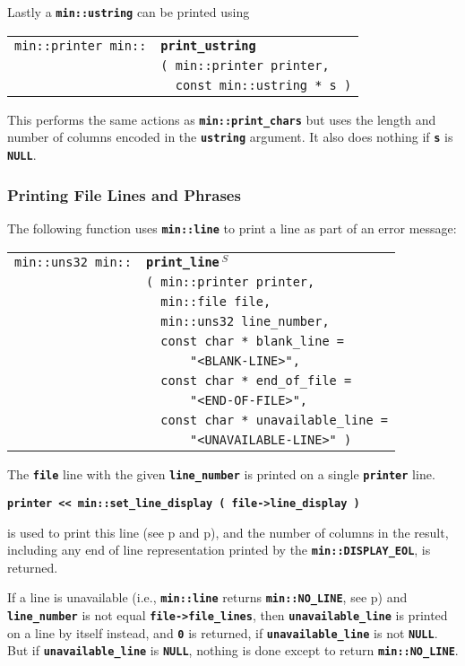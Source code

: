\documentclass[12pt]{article}
\makeatletter
\newcommand{\TT}[1]{{\tt \bfseries #1}}
\newcommand{\ttindex}[1]{\index{#1@{\tt #1}}}
\newcommand{\pagref}[1]{p\pageref{#1}}
\newcommand{\EOL}{\penalty \exhyphenpenalty}
\newenvironment{indpar}[1][0.3in]%
	{\begin{list}{}%
		     {\setlength{\itemsep}{0in}%
		      \setlength{\topsep}{0in}%
		      \setlength{\parsep}{1ex}%
		      \setlength{\labelwidth}{#1}%
		      \setlength{\leftmargin}{#1}%
		      \addtolength{\leftmargin}{\labelsep}}%
	 \item}%
	{\end{list}}
\newcommand{\LABEL}[1]{\label{#1}}
\newlength{\ARGBREAKLENGTH}
\newcommand{\ARGBREAK}[1][\ARGBREAKLENGTH]{\\&\hspace*{#1}}
\newcommand{\MINKEY}[1]%
	   {\TT{#1}\ttindex{min::#1}\ttindex{#1}}
\newcommand{\RESIZE}{$\,^S$}
\makeatother
\begin{document}
Lastly a \TT{min::ustring} can be printed using

\begin{indpar}[1em]\begin{tabular}{r@{}l}
\verb|min::printer min::| & \MINKEY{print\_ustring}\ARGBREAK
    \verb|( min::printer printer,|\ARGBREAK
    \verb|  const min::ustring * s )|
\LABEL{MIN::PRINT_USTRING} \\
\end{tabular}\end{indpar}

This performs the same actions as \TT{min::print\_chars} but
uses the length and number of columns encoded in the
\TT{ustring} argument.  It also does nothing if \TT{s} is \TT{NULL}.


\subsubsection{Printing File Lines and Phrases}
\label{PRINTING-FILE-LINES-AND-PHRASES}

The following function uses \TT{min::line} to print a line as part of
an error message:

\begin{indpar}[1em]\begin{tabular}{r@{}l}
\verb|min::uns32 min::|
    & \MINKEY{print\_\EOL line\RESIZE}\ARGBREAK
      \verb|( min::printer printer,|\ARGBREAK
      \verb|  min::file file,|\ARGBREAK
      \verb|  min::uns32 line_number,|\ARGBREAK
      \verb|  const char * blank_line =|\ARGBREAK
      \verb|      "<BLANK-LINE>",|\ARGBREAK
      \verb|  const char * end_of_file =|\ARGBREAK
      \verb|      "<END-OF-FILE>",|\ARGBREAK
      \verb|  const char * unavailable_line =|\ARGBREAK
      \verb|      "<UNAVAILABLE-LINE>" )|
\LABEL{MIN::PRINT_LINE} \\
\end{tabular}\end{indpar}

The \TT{file} line with the given \TT{line\_number}
is printed on a single \TT{printer} line.
\begin{center}
\TT{printer <{}< min::set\_line\_display ( file->line\_display )}
\end{center}
is used to print this line
(see \pagref{FILE_LINE_DISPLAY} and \pagref{MIN::SET_LINE_DISPLAY}),
and the number of columns in the result,
including any end of line representation printed by the
\TT{min::\EOL DISPLAY\_\EOL EOL}, is returned.

If a line is
unavailable (i.e., \TT{min::\EOL line} returns \TT{min::\EOL NO\_\EOL LINE},
see \pagref{MIN::LINE_OF_FILE})
and \TT{line\_\EOL number} is not equal \TT{file->\EOL file\_\EOL lines},
then \TT{unavailable\_\EOL line} is printed on a line by itself instead, and
\TT{0} is returned, if \TT{unavailable\_\EOL line} is not \TT{NULL}.
But if \TT{unavailable\_\EOL line} is \TT{NULL}, nothing is done except
to return \TT{min::\EOL NO\_\EOL LINE}.
\end{document}
